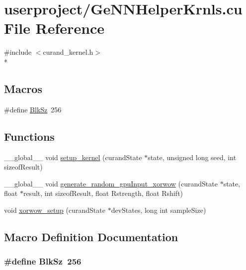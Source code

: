 \hypertarget{GeNNHelperKrnls_8cu}{\section{userproject/\+Ge\+N\+N\+Helper\+Krnls.cu File Reference}
\label{GeNNHelperKrnls_8cu}
}
{\ttfamily \#include $<$curand\+\_\+kernel.\+h$>$}\\*
\subsection*{Macros}
\begin{DoxyCompactItemize}
\item 
\#define \hyperlink{GeNNHelperKrnls_8cu_a9a16f85c609abdf08b9d24186215fcae}{Blk\+Sz}~256
\end{DoxyCompactItemize}
\subsection*{Functions}
\begin{DoxyCompactItemize}
\item 
\+\_\+\+\_\+global\+\_\+\+\_\+ void \hyperlink{GeNNHelperKrnls_8cu_adb85534870a979bdcefda11d2d40de54}{setup\+\_\+kernel} (curand\+State $\ast$state, unsigned long seed, int sizeof\+Result)
\item 
\+\_\+\+\_\+global\+\_\+\+\_\+ void \hyperlink{GeNNHelperKrnls_8cu_a122e8a9c8d633ea1584f73849d059e7b}{generate\+\_\+random\+\_\+gpu\+Input\+\_\+xorwow} (curand\+State $\ast$state, float $\ast$result, int sizeof\+Result, float Rstrength, float Rshift)
\item 
void \hyperlink{GeNNHelperKrnls_8cu_addeb2120a5db41facb5d99b838c714e5}{xorwow\+\_\+setup} (curand\+State $\ast$dev\+States, long int sample\+Size)
\end{DoxyCompactItemize}


\subsection{Macro Definition Documentation}
\hypertarget{GeNNHelperKrnls_8cu_a9a16f85c609abdf08b9d24186215fcae}{
\subsubsection[{Blk\+Sz}]{\setlength{\rightskip}{0pt plus 5cm}\#define Blk\+Sz~256}}\label{GeNNHelperKrnls_8cu_a9a16f85c609abdf08b9d24186215fcae}


